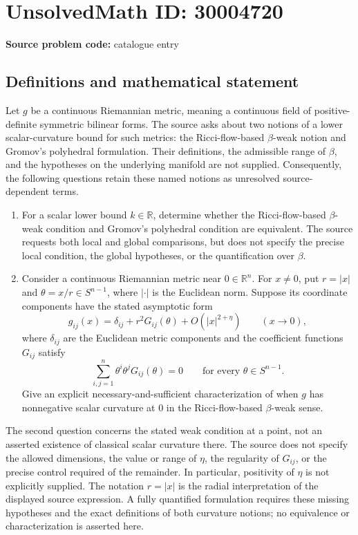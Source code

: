 \documentclass[11pt]{article}
\newcommand{\R}{\mathbb{R}}
\begin{document}
\section*{UnsolvedMath ID: 30004720}
\textbf{Source problem code:} catalogue entry
\subsection{Definitions and mathematical statement}
Let \(g\) be a continuous Riemannian metric, meaning a continuous field of positive-definite symmetric bilinear forms. The source asks about two notions of a lower scalar-curvature bound for such metrics: the Ricci-flow-based \(\beta\)-weak notion and Gromov's polyhedral formulation. Their definitions, the admissible range of \(\beta\), and the hypotheses on the underlying manifold are not supplied. Consequently, the following questions retain these named notions as unresolved source-dependent terms.

\begin{enumerate}
\item For a scalar lower bound \(k\in\R\), determine whether the Ricci-flow-based \(\beta\)-weak condition and Gromov's polyhedral condition are equivalent. The source requests both local and global comparisons, but does not specify the precise local condition, the global hypotheses, or the quantification over \(\beta\).
\item Consider a continuous Riemannian metric near \(0\in\R^n\). For \(x\ne0\), put \(r=|x|\) and \(\theta=x/r\in S^{n-1}\), where \(|\cdot|\) is the Euclidean norm. Suppose its coordinate components have the stated asymptotic form
\[
 g_{ij}(x)=\delta_{ij}+r^2G_{ij}(\theta)+O\!\left(|x|^{2+\eta}\right)
 \qquad (x\to0),
\]
where \(\delta_{ij}\) are the Euclidean metric components and the coefficient functions \(G_{ij}\) satisfy
\[
 \sum_{i,j=1}^{n}\theta^i\theta^jG_{ij}(\theta)=0
 \qquad\text{for every }\theta\in S^{n-1}.
\]
Give an explicit necessary-and-sufficient characterization of when \(g\) has nonnegative scalar curvature at \(0\) in the Ricci-flow-based \(\beta\)-weak sense.
\end{enumerate}

The second question concerns the stated weak condition at a point, not an asserted existence of classical scalar curvature there. The source does not specify the allowed dimensions, the value or range of \(\eta\), the regularity of \(G_{ij}\), or the precise control required of the remainder. In particular, positivity of \(\eta\) is not explicitly supplied. The notation \(r=|x|\) is the radial interpretation of the displayed source expression. A fully quantified formulation requires these missing hypotheses and the exact definitions of both curvature notions; no equivalence or characterization is asserted here.
\end{document}
